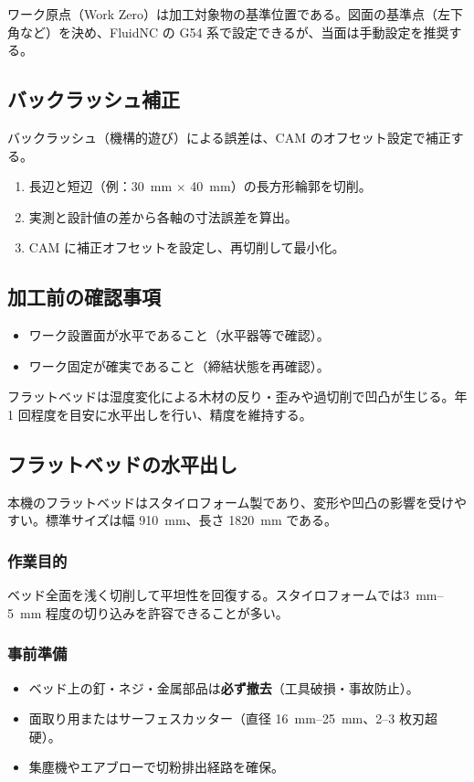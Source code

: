 \documentclass[uplatex,dvipdfmx]{ujarticle}
\begin{document}
ワーク原点（Work Zero）は加工対象物の基準位置である。図面の基準点（左下角など）を決め、FluidNC の G54 系で設定できるが、当面は手動設定を推奨する。

\subsection{バックラッシュ補正}

バックラッシュ（機構的遊び）による誤差は、CAM のオフセット設定で補正する。

\begin{enumerate}
  \item 長辺と短辺（例：\SI{30}{\milli\meter} $\times$ \SI{40}{\milli\meter}）の長方形輪郭を切削。
  \item 実測と設計値の差から各軸の寸法誤差を算出。
  \item CAM に補正オフセットを設定し、再切削して最小化。
\end{enumerate}

\subsection{加工前の確認事項}

\begin{itemize}
  \item ワーク設置面が水平であること（水平器等で確認）。
  \item ワーク固定が確実であること（締結状態を再確認）。
\end{itemize}

フラットベッドは湿度変化による木材の反り・歪みや過切削で凹凸が生じる。年 1 回程度を目安に水平出しを行い、精度を維持する。

\subsection{フラットベッドの水平出し}

本機のフラットベッドはスタイロフォーム製であり、変形や凹凸の影響を受けやすい。標準サイズは幅 \SI{910}{\milli\meter}、長さ \SI{1820}{\milli\meter} である。

\subsubsection*{作業目的}
ベッド全面を浅く切削して平坦性を回復する。スタイロフォームでは\SIrange{3}{5}{\milli\meter} 程度の切り込みを許容できることが多い。

\subsubsection*{事前準備}
\begin{itemize}
  \item ベッド上の釘・ネジ・金属部品は\textbf{必ず撤去}（工具破損・事故防止）。
  \item 面取り用またはサーフェスカッター（直径 \SIrange{16}{25}{\milli\meter}、2--3 枚刃超硬）。
  \item 集塵機やエアブローで切粉排出経路を確保。
\end{itemize}
\end{document}
